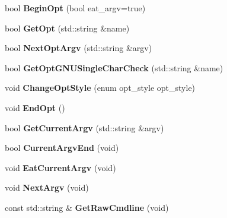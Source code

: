 \begin{DoxyCompactItemize}
\item 
\hypertarget{classCommandLine_ad1780afea11368a1e6fdd35276a8c678}{bool {\bfseries Begin\-Opt} (bool eat\-\_\-argv=true)}\label{classCommandLine_ad1780afea11368a1e6fdd35276a8c678}

\item 
\hypertarget{classCommandLine_a4440913abd4b9f06635b3df3fe0ee7d4}{bool {\bfseries Get\-Opt} (std\-::string \&name)}\label{classCommandLine_a4440913abd4b9f06635b3df3fe0ee7d4}

\item 
\hypertarget{classCommandLine_a090151cab04fbb6e886f2053e2ef56a3}{bool {\bfseries Next\-Opt\-Argv} (std\-::string \&argv)}\label{classCommandLine_a090151cab04fbb6e886f2053e2ef56a3}

\item 
\hypertarget{classCommandLine_ac94cc029aca101fb5e39189fca40ff91}{bool {\bfseries Get\-Opt\-G\-N\-U\-Single\-Char\-Check} (std\-::string \&name)}\label{classCommandLine_ac94cc029aca101fb5e39189fca40ff91}

\item 
\hypertarget{classCommandLine_ac0f91f63b77400b7266128dbc1445b1b}{void {\bfseries Change\-Opt\-Style} (enum opt\-\_\-style opt\-\_\-style)}\label{classCommandLine_ac0f91f63b77400b7266128dbc1445b1b}

\item 
\hypertarget{classCommandLine_a941c71120faefc5e3c0876d69ac78491}{void {\bfseries End\-Opt} ()}\label{classCommandLine_a941c71120faefc5e3c0876d69ac78491}

\item 
\hypertarget{classCommandLine_a331a3c1e87e6a2c0306cf1e9f7a67945}{bool {\bfseries Get\-Current\-Argv} (std\-::string \&argv)}\label{classCommandLine_a331a3c1e87e6a2c0306cf1e9f7a67945}

\item 
\hypertarget{classCommandLine_ad457fad3218a71163a058bc095cfe0ed}{bool {\bfseries Current\-Argv\-End} (void)}\label{classCommandLine_ad457fad3218a71163a058bc095cfe0ed}

\item 
\hypertarget{classCommandLine_ab34d4cf4cb665ecb694f90e5f9c524c3}{void {\bfseries Eat\-Current\-Argv} (void)}\label{classCommandLine_ab34d4cf4cb665ecb694f90e5f9c524c3}

\item 
\hypertarget{classCommandLine_a89dd608d9095a3321d48eb90ecf210ba}{void {\bfseries Next\-Argv} (void)}\label{classCommandLine_a89dd608d9095a3321d48eb90ecf210ba}

\item 
\hypertarget{classCommandLine_aee2a64d26ecb790666b084d79dd565b0}{const std\-::string \& {\bfseries Get\-Raw\-Cmdline} (void)}\label{classCommandLine_aee2a64d26ecb790666b084d79dd565b0}

\end{DoxyCompactItemize}


